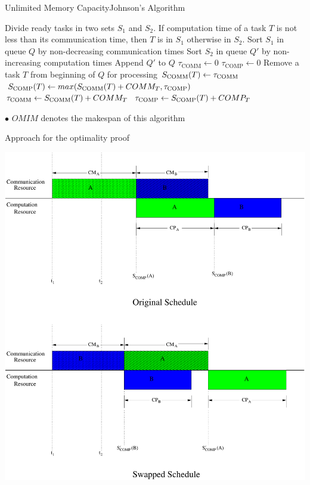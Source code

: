 \documentclass[mathserif,hyperref={pdfpagemode=FullScreen}]{beamer}
\begin{document}
\begin{frame}{Unlimited Memory Capacity}{Johnson's Algorithm}
\begin{algorithm}[H]
\begin{algorithmic}[1]
	\STATE Divide ready tasks in two sets $S_1$ and $S_2$. If computation time of a task $T$ is not less than its communication time, then $T$ is in $S_1$ otherwise in $S_2$.
	\STATE Sort $S_1$ in queue $Q$ by non-decreasing communication times
	\STATE Sort $S_2$ in queue $Q'$ by non-increasing computation times
	\STATE Append $Q'$ to $Q$
	\STATE $\tau_{\text{COMM}} \gets 0$ \hfill{}
	\STATE $\tau_{\text{COMP}} \gets 0$\hfill {}
	\STATE Remove a task $T$ from beginning of $Q$ for processing
	\STATE ${S}_{\text{COMM}}(T) \gets \tau_{\text{COMM}}$
	\STATE ${S}_{\text{COMP}}(T) \gets max({S}_{\text{COMM}}(T) + COMM_T, \tau_{\text{COMP}})$
	\STATE $\tau_{\text{COMM}} \gets {S}_{\text{COMM}}(T) + COMM_T$
	\STATE $\tau_{\text{COMP}} \gets {S}_{\text{COMP}}(T) + COMP_T$
	\ENDWHILE
\end{algorithmic}
\end{algorithm}
$\bullet$ $OMIM$ denotes the makespan of this algorithm
\end{frame}


\begin{frame}{Approach for the optimality proof}
\vspace*{-0.5cm}
\begin{center}
\includegraphics[scale=0.32]{./diagrams/original_swapped_schedules-eps-converted-to.pdf}
\end{center}

\end{frame}
\end{document}
